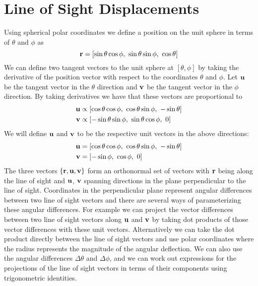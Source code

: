 \section{Line of Sight Displacements}
Using spherical polar coordinates we define a position on the unit sphere in terms of $\theta$ and $\phi$ as
$${\bf r} = [\sin\theta \cos\phi, ~\sin\theta \sin\phi, ~\cos\theta]$$We can define two tangent vectors to the unit sphere at $[\theta, \phi]$ by taking the derivative of the position vector with respect to the coordinates $\theta$ and $\phi$. Let $\bf u$ be the tangent vector in the $\theta$ direction and $\bf v$ be the tangent vector in the $\phi$ direction. 
By taking derivatives we have that these vectors are proportional to 
\begin{align*}
{\bf u} &\propto [\cos\theta \cos\phi, ~\cos\theta \sin\phi,~ -\sin\theta]\\
{\bf v} &\propto [-\sin\theta \sin\phi, ~\sin\theta \cos\phi, ~0]
\end{align*}
We will define $\bf u$ and $\bf v$ to be the respective unit vectors in the above directions: 
\begin{align*}
{\bf u} &=  [\cos\theta \cos\phi, ~\cos\theta \sin\phi, ~-\sin\theta]\\
{\bf v} &= [ -\sin\phi, ~\cos\phi, ~0]
\end{align*}
The three vectors $\{{\bf r}, {\bf u}, {\bf v} \}$ form an orthonormal set of vectors with $\bf r$ being along the line of sight and $\bf u$, $\bf v$ spanning directions in the plane perpendicular to the line of sight.
Coordinates in the perpendicular plane represent angular differences between two line of sight vectors and there are several ways of parameterizing these angular differences. For example we can project the vector differences between two line of sight vectors along $\bf u$ and $\bf v$ by taking dot products of those vector differences with these unit vectors. 
Alternatively we can take the dot product directly between the line of sight vectors and use polar coordinates where the radius represents the magnitude of the angular deflection. We can also use the angular differences $\Delta\theta$ and 
$\Delta\phi$, and we can work out expressions for the projections of the line of sight vectors in terms of their components using trigonometric identities. \\


